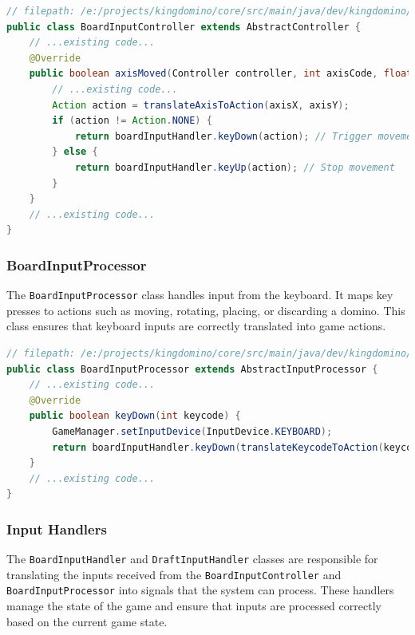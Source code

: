 \documentclass[conference]{IEEEtran}
\begin{document}
\begin{lstlisting}[language=Java]
// filepath: /e:/projects/kingdomino/core/src/main/java/dev/kingdomino/game/BoardInputController.java
public class BoardInputController extends AbstractController {
    // ...existing code...
    @Override
    public boolean axisMoved(Controller controller, int axisCode, float value) {
        // ...existing code...
        Action action = translateAxisToAction(axisX, axisY);
        if (action != Action.NONE) {
            return boardInputHandler.keyDown(action); // Trigger movement
        } else {
            return boardInputHandler.keyUp(action); // Stop movement
        }
    }
    // ...existing code...
}
\end{lstlisting}

\subsubsection{BoardInputProcessor}
The \texttt{BoardInputProcessor} class handles input from the keyboard. It maps key presses to actions such as moving, rotating, placing, or discarding a domino. This class ensures that keyboard inputs are correctly translated into game actions.

\begin{lstlisting}[language=Java]
// filepath: /e:/projects/kingdomino/core/src/main/java/dev/kingdomino/game/BoardInputProcessor.java
public class BoardInputProcessor extends AbstractInputProcessor {
    // ...existing code...
    @Override
    public boolean keyDown(int keycode) {
        GameManager.setInputDevice(InputDevice.KEYBOARD);
        return boardInputHandler.keyDown(translateKeycodeToAction(keycode));
    }
    // ...existing code...
}
\end{lstlisting}

\subsubsection{Input Handlers}
The \texttt{BoardInputHandler} and \texttt{DraftInputHandler} classes are responsible for translating the inputs received from the \texttt{BoardInputController} and \texttt{BoardInputProcessor} into signals that the system can process. These handlers manage the state of the game and ensure that inputs are processed correctly based on the current game state.
\end{document}
